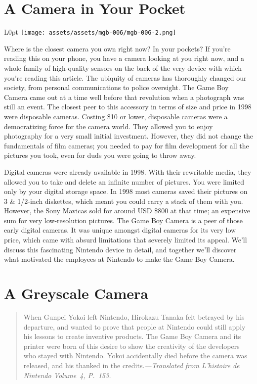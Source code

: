 \documentclass{book}
\begin{document}
\newpage\FloatBarrier\needspace{10mm}\section*{A Camera in Your Pocket}\nopagebreak[4]
\begin{wrapfigure}{L}{0pt} \texttt{[image: assets/assets/mgb-006/mgb-006-2.png]}\end{wrapfigure}
Where is the closest camera you own right now? In your pockets? If you’re reading this on your phone, you have a camera looking at you right now, and a whole family of high-quality sensors on the back of the very device with which you’re reading this article. The ubiquity of cameras has thoroughly changed our society, from personal communications to police oversight. The Game Boy Camera came out at a time well before that revolution when a photograph was still an event. The closest peer to this accessory in terms of size and price in 1998 were disposable cameras. Costing \$10 or lower, disposable cameras were a democratizing force for the camera world. They allowed you to enjoy photography for a very small initial investment. However, they did not change the fundamentals of film cameras; you needed to pay for film development for all the pictures you took, even for duds you were going to throw away.

Digital cameras were already available in 1998. With their rewritable media, they allowed you to take and delete an infinite number of pictures. You were limited only by your digital storage space. In 1998 most cameras saved their pictures on 3 \& 1/2-inch diskettes, which meant you could carry a stack of them with you. However, the Sony Mavicas sold for around USD \$800 at that time; an expensive sum for very low-resolution pictures. The Game Boy Camera is a peer of those early digital cameras. It was unique amongst digital cameras for its very low price, which came with absurd limitations that severely limited its appeal. We’ll discuss this fascinating Nintendo device in detail, and together we’ll discover what motivated the employees at Nintendo to make the Game Boy Camera.

\FloatBarrier\needspace{10mm}\section*{A Greyscale Camera}\nopagebreak[4]

\begin{quote}When Gunpei Yokoi left Nintendo, Hirokazu Tanaka felt betrayed by his departure, and wanted to prove that people at Nintendo could still apply his lessons to create inventive products. The Game Boy Camera and its printer were born of this desire to show the creativity of the developers who stayed with Nintendo. Yokoi accidentally died before the camera was released, and his thanked in the credits.\newline \emph{—Translated from \emph{L’histoire de Nintendo Volume 4}, P. 153.}\end{quote} \par
\end{document}
